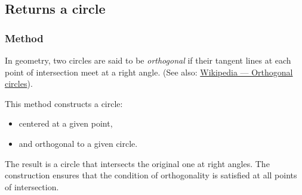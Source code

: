 





\subsection{Returns a circle}

\subsubsection{Method }
\label{ssub:method_circle_orthogonal_from_pt}

In geometry, two circles are said to be \emph{orthogonal} if their tangent lines at each point of intersection meet at a right angle.
(See also: \href{https://en.wikipedia.org/wiki/Orthogonal_circles}{Wikipedia — Orthogonal circles}).

\medskip

This method constructs a circle:
\begin{itemize}
  \item centered at a given point,
  \item and orthogonal to a given circle.
\end{itemize}


The result is a circle that intersects the original one at right angles. The construction ensures that the condition of orthogonality is satisfied at all points of intersection.

\vspace{1em}

\begin{minipage}{.5\textwidth}
\begin{center}
\end{center}
\end{minipage}
\begin{minipage}{.5\textwidth}
\begin{tkzexample}
\end{tkzexample}
\end{minipage}

